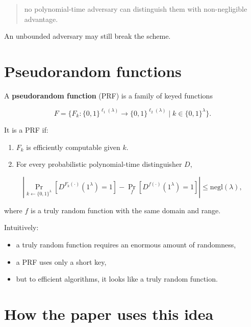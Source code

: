 \documentclass[11pt]{article}
\begin{document}
\begin{quote}
no polynomial-time adversary can distinguish them with non-negligible advantage.
\end{quote}

\begin{callout}[warning]
\label{co:unbounded-adversary}
An unbounded adversary may still break the scheme.
\end{callout}

\section{Pseudorandom functions}

\begin{definition}
\label{def:prf}
A \textbf{pseudorandom function} (PRF) is a family of keyed functions

\[
F=\{F_k:\{0,1\}^{\ell_1(\lambda)}
\to
\{0,1\}^{\ell_2(\lambda)}
\mid k\in\{0,1\}^{\lambda}\}.
\]

It is a PRF if:

\begin{enumerate}[label=\arabic*.]
    \item $F_k$ is efficiently computable given $k$.
    
    \item For every probabilistic polynomial-time distinguisher $D$,
\end{enumerate}

\[
\left|
\Pr_{k\leftarrow\{0,1\}^{\lambda}}
\left[D^{F_k(\cdot)}(1^\lambda)=1\right]
-
\Pr_f
\left[D^{f(\cdot)}(1^\lambda)=1\right]
\right|
\le
\mathrm{negl}(\lambda),
\]

where $f$ is a truly random function with the same domain and range.
\end{definition}

\begin{remark}
\label{rem:prf-intuition}
Intuitively:

\begin{itemize}
    \item a truly random function requires an enormous amount of randomness,
    \item a PRF uses only a short key,
    \item but to efficient algorithms, it looks like a truly random function.
\end{itemize}
\end{remark}

\section{How the paper uses this idea}
\end{document}
